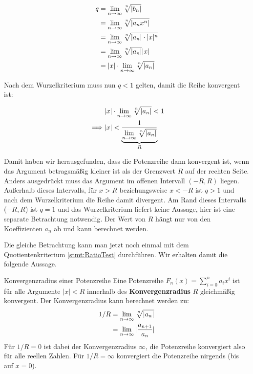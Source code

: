 \begin{alignat*}{1}
    q &= \lim\limits_{n\to\infty} \nroot{n}{|b_n|} \\
      &= \lim\limits_{n\to\infty} \nroot{n}{|a_n x^n|} \\
      &= \lim\limits_{n\to\infty} \nroot{n}{|a_n| \cdot |x|^n} \\
      &= \lim\limits_{n\to\infty} \nroot{n}{|a_n|} |x| \\
      &= |x| \cdot \lim\limits_{n\to\infty} \nroot{n}{|a_n|}
\end{alignat*}

Nach dem Wurzelkriterium muss nun $q<1$ gelten, damit die Reihe konvergent ist:

\begin{alignat*}{1}
             & |x| \cdot \lim\limits_{n\to\infty} \nroot{n}{|a_n|} < 1 \\
    \implies & |x| < \underbrace{\frac{1}{\lim\limits_{n\to\infty} \nroot{n}{|a_n|}}}_R
\end{alignat*}

Damit haben wir herausgefunden, dass die Potenzreihe dann konvergent ist, wenn das Argument betragsmäßig kleiner ist als der Grenzwert $R$ auf der rechten Seite. Anders ausgedrückt muss das Argument im offenen Intervall $(-R,R)$ liegen. Außerhalb dieses Intervalls, für $x > R$ beziehungsweise $x<-R$ ist $q>1$ und nach dem Wurzelkriterium die Reihe damit divergent. Am Rand dieses Intervalls ($-R,R$) ist $q=1$ und das Wurzelkriterium liefert keine Aussage, hier ist eine separate Betrachtung notwendig. Der Wert von $R$ hängt nur von den Koeffizienten $a_n$ ab und kann berechnet werden.

Die gleiche Betrachtung kann man jetzt noch einmal mit dem Quotientenkriterium \ref{stmt:RatioTest} durchführen. Wir erhalten damit die folgende Aussage.

\begin{statement}{Konvergenzradius einer Potenzreihe}
    Eine Potenzreihe $F_n(x) = \sum\limits_{i=0}^n a_i x^i$ ist für alle Argumente $|x| < R$ innerhalb des \textbf{Konvergenzradius} $R$ gleichmäßig konvergent. Der Konvergenzradius kann berechnet werden zu:
    \begin{alignat*}{1}
        1/R &= \lim\limits_{n\to\infty} \nroot{n}{|a_n|} \\
            &= \lim\limits_{n\to\infty} |\frac{a_{n+1}}{a_n}|
    \end{alignat*}
    Für $1/R=0$ ist dabei der Konvergenzradius $\infty$, die Potenzreihe konvergiert also für alle reellen Zahlen. Für $1/R=\infty$ konvergiert die Potenzreihe nirgends (bis auf $x=0$).
\end{statement}

